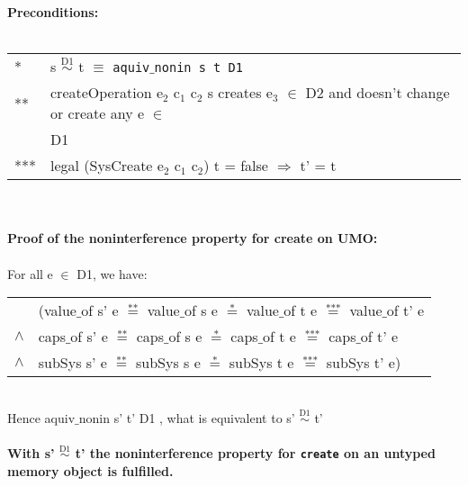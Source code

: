 \textbf{Preconditions:} \\ \\
\begin{tabular}{ll}
* & s $\overset{\text{D1}}{\sim}$ t $\equiv$ \texttt{aquiv$\_$nonin s t D1}	\\ 
** & createOperation e$_2$ c$_1$ c$_2$ s creates e$_3$ $\in$ D2 and doesn't change or create any e $\in$ \\
&  D1 \\
*** & legal (SysCreate e$_2$ c$_1$ c$_2$) t = false $\Rightarrow$ t' = t
\end{tabular}\\ \\ 
\textbf{Proof of the noninterference property for create on UMO:} \\ \\
For all e $\in$ D1, we have: \\ 
\begin{tabular}{ll}
& (value$\_$of s' e $\overset{\text{**}}{=}$ value$\_$of s e $\overset{\text{*}}{=}$ value$\_$of t e $\overset{\text{***}}{=}$ value$\_$of t' e \\
$\wedge$ & caps$\_$of s' e $\overset{\text{**}}{=}$ caps$\_$of s e $\overset{\text{*}}{=}$ caps$\_$of t e $\overset{\text{***}}{=}$ caps$\_$of t' e \\
$\wedge$ & subSys s' e $\overset{\text{**}}{=}$ subSys s e $\overset{\text{*}}{=}$ subSys t e $\overset{\text{***}}{=}$ subSys t' e)
\end{tabular} \\
Hence aquiv$\_$nonin s' t' D1 , what is equivalent to s' $\overset{\text{D1}}{\sim}$ t' \\ \\ 
\textbf{With s' $\overset{\text{D1}}{\sim}$ t' the noninterference property for \texttt{create} on an untyped memory object is fulfilled.} 
